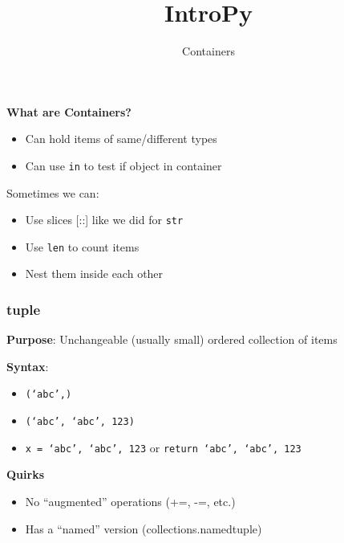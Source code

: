 \documentclass{beamer}
\title{IntroPy}
\subtitle{Containers}
\begin{document}
\maketitle

\begin{frame}
  \textbf{What are Containers?}

  \begin{itemize}
    \item Can hold items of same/different types
    \item Can use \texttt{in} to test if object in container
  \end{itemize}

  Sometimes we can:
  \begin{itemize}
    \item Use slices [::] like we did for \texttt{str}
    \item Use \texttt{len} to count items
    \item Nest them inside each other
  \end{itemize}
\end{frame}

\begin{frame}
  \frametitle{tuple}

  \textbf{Purpose}: Unchangeable (usually small) ordered collection of items

  \textbf{Syntax}: 
  \begin{itemize}
    \item \texttt{(`abc',)} 
    \item \texttt{(`abc', `abc', 123)} 
    \item \texttt{x = `abc', `abc', 123} or \texttt{return `abc', `abc', 123}
  \end{itemize}

  \textbf{Quirks}
  \begin{itemize}
    \item No ``augmented'' operations (+=, -=, etc.)
    \item Has a ``named'' version (collections.namedtuple)
  \end{itemize}
\end{frame}
\end{document}
